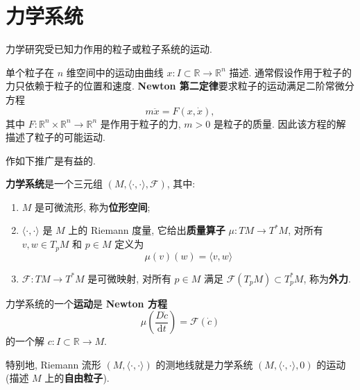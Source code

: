 \section{力学系统}\label{sec:mechanical-systems}

力学研究受已知力作用的粒子或粒子系统的运动.

\begin{RiemannExample}\label{ex:single-particle-in-euclidean-space}
单个粒子在 $n$ 维空间中的运动由曲线 $x:I\subset\mathbb{R}\to\mathbb{R}^n$ 描述. 通常假设作用于粒子的力只依赖于粒子的位置和速度. \textbf{Newton 第二定律}要求粒子的运动满足二阶常微分方程
\[
  m\ddot x=F(x,\dot x),
\]
其中 $F:\mathbb{R}^n\times\mathbb{R}^n\to\mathbb{R}^n$ 是作用于粒子的力, $m>0$ 是粒子的质量. 因此该方程的解描述了粒子的可能运动.
\end{RiemannExample}

作如下推广是有益的.

\begin{RiemannDefinition}\label{def:mechanical-system-and-motion}
\textbf{力学系统}是一个三元组 $(M,\langle\cdot,\cdot\rangle,\mathcal{F})$, 其中:
\begin{enumerate}[label=(\roman*),leftmargin=*]
\item $M$ 是可微流形, 称为\textbf{位形空间};
\item $\langle\cdot,\cdot\rangle$ 是 $M$ 上的 Riemann 度量, 它给出\textbf{质量算子} $\mu:TM\to T^*M$, 对所有 $v,w\in T_pM$ 和 $p\in M$ 定义为
\[
  \mu(v)(w)=\langle v,w\rangle
\]
\item $\mathcal{F}:TM\to T^*M$ 是可微映射, 对所有 $p\in M$ 满足 $\mathcal{F}(T_pM)\subset T_p^*M$, 称为\textbf{外力}.
\end{enumerate}
力学系统的一个\textbf{运动}是 \textbf{Newton 方程}
\[
  \mu\left(\frac{D\dot c}{\mathrm{d}t}\right)=\mathcal{F}(\dot c)
\]
的一个解 $c:I\subset\mathbb{R}\to M$.
\end{RiemannDefinition}

\begin{RiemannRemark}\label{rem:free-particle-geodesics}
特别地, Riemann 流形 $(M,\langle\cdot,\cdot\rangle)$ 的测地线就是力学系统 $(M,\langle\cdot,\cdot\rangle,0)$ 的运动 (描述 $M$ 上的\textbf{自由粒子}).
\end{RiemannRemark}

